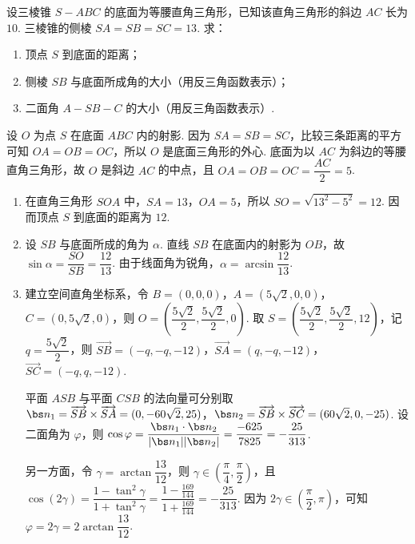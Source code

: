 \begin{problem}
设三棱锥 \(S-ABC\) 的底面为等腰直角三角形，已知该直角三角形的斜边 \(AC\) 长为 \(10\). 三棱锥的侧棱 \(SA=SB=SC=13\). 求：

\begin{enumerate}
\item 顶点 \(S\) 到底面的距离；
\item 侧棱 \(SB\) 与底面所成角的大小（用反三角函数表示）；
\item 二面角 \(A-SB-C\) 的大小（用反三角函数表示）.
\end{enumerate}

\end{problem}

\begin{solution}
设 \(O\) 为点 \(S\) 在底面 \(ABC\) 内的射影. 因为 \(SA=SB=SC\)，比较三条距离的平方可知 \(OA=OB=OC\)，所以 \(O\) 是底面三角形的外心. 底面为以 \(AC\) 为斜边的等腰直角三角形，故 \(O\) 是斜边 \(AC\) 的中点，且
\(OA=OB=OC=\dfrac{AC}{2}=5\).

\begin{enumerate}
\item 在直角三角形 \(SOA\) 中，\(SA=13\)，\(OA=5\)，所以 \(SO=\sqrt{13^2-5^2}=12\). 因而顶点 \(S\) 到底面的距离为 \(12\).
\item 设 \(SB\) 与底面所成的角为 \(\alpha\). 直线 \(SB\) 在底面内的射影为 \(OB\)，故 \(\sin\alpha=\dfrac{SO}{SB}=\dfrac{12}{13}\). 由于线面角为锐角，\(\alpha=\arcsin\dfrac{12}{13}\).
\item 建立空间直角坐标系，令 \(B=(0,0,0)\)，\(A=(5\sqrt2,0,0)\)，\(C=(0,5\sqrt2,0)\)，则 \(O=\left(\dfrac{5\sqrt2}{2},\dfrac{5\sqrt2}{2},0\right)\). 取 \(S=\left(\dfrac{5\sqrt2}{2},\dfrac{5\sqrt2}{2},12\right)\)，记 \(q=\dfrac{5\sqrt2}{2}\)，则
\(\overrightarrow{SB}=(-q,-q,-12)\)，\(\overrightarrow{SA}=(q,-q,-12)\)，\(\overrightarrow{SC}=(-q,q,-12)\).

平面 \(ASB\) 与平面 \(CSB\) 的法向量可分别取
\(\bs n_1=\overrightarrow{SB}\times\overrightarrow{SA}=(0,-60\sqrt2,25)\)，\(\bs n_2=\overrightarrow{SB}\times\overrightarrow{SC}=(60\sqrt2,0,-25)\). 设二面角为 \(\varphi\)，则
\(\cos\varphi=\dfrac{\bs n_1\cdot\bs n_2}{|\bs n_1||\bs n_2|}=\dfrac{-625}{7825}=-\dfrac{25}{313}\).

另一方面，令 \(\gamma=\arctan\dfrac{13}{12}\)，则 \(\gamma\in\left(\dfrac\pi4,\dfrac\pi2\right)\)，且
\(\cos(2\gamma)=\dfrac{1-\tan^2\gamma}{1+\tan^2\gamma}=\dfrac{1-\frac{169}{144}}{1+\frac{169}{144}}=-\dfrac{25}{313}\). 因为 \(2\gamma\in\left(\dfrac\pi2,\pi\right)\)，可知 \(\varphi=2\gamma=2\arctan\dfrac{13}{12}\).
\end{enumerate}
\end{solution}

